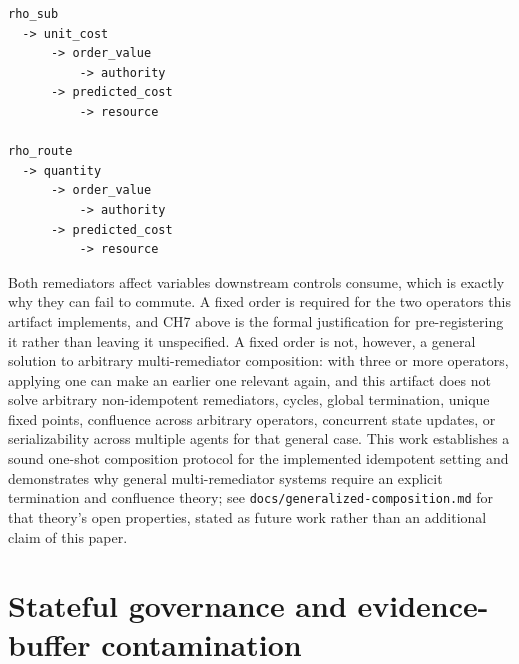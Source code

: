 \documentclass[11pt,a4paper]{article}
\theoremstyle{definition}
\begin{document}
\begin{verbatim}
rho_sub
  -> unit_cost
      -> order_value
          -> authority
      -> predicted_cost
          -> resource

rho_route
  -> quantity
      -> order_value
          -> authority
      -> predicted_cost
          -> resource
\end{verbatim}

Both remediators affect variables downstream controls consume, which is exactly why they can fail to commute. A fixed order is required for the two operators this artifact implements, and CH7 above is the formal justification for pre-registering it rather than leaving it unspecified. A fixed order is not, however, a general solution to arbitrary multi-remediator composition: with three or more operators, applying one can make an earlier one relevant again, and this artifact does not solve arbitrary non-idempotent remediators, cycles, global termination, unique fixed points, confluence across arbitrary operators, concurrent state updates, or serializability across multiple agents for that general case. This work establishes a sound one-shot composition protocol for the implemented idempotent setting and demonstrates why general multi-remediator systems require an explicit termination and confluence theory; see \texttt{docs/generalized-composition.md} for that theory's open properties, stated as future work rather than an additional claim of this paper.

\section{Stateful governance and evidence-buffer contamination}
\end{document}
